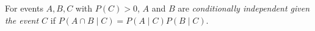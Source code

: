 
For events $A,B,C$ with $P(C)>0$, $A$ and $B$ are \emph{conditionally independent given the event $C$} if $P(A\cap B\mid C)=P(A\mid C)P(B\mid C)$.
